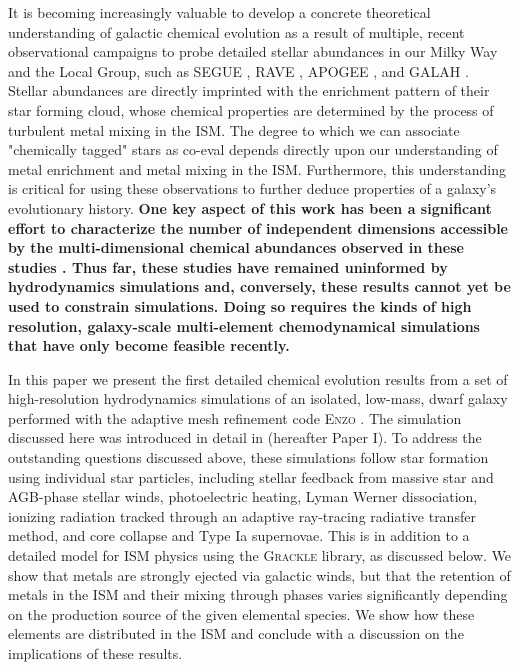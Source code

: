 \documentclass[twocolumn]{aastex61}
\begin{document}
It is becoming increasingly valuable to develop a concrete theoretical understanding of galactic chemical evolution as a result of multiple, recent observational campaigns to probe detailed stellar abundances in our Milky Way and the Local Group, such as SEGUE \citep{Yanny2009}, RAVE \citep{Kunder2017}, APOGEE \citep{Anders2014}, and GALAH \citep{Buder2018}. Stellar abundances are directly imprinted with the enrichment pattern of their star forming cloud, whose chemical properties are determined by the process of turbulent metal mixing in the ISM. The degree to which we can associate "chemically tagged" stars as co-eval depends directly upon our understanding of metal enrichment and metal mixing in the ISM. Furthermore, this understanding is critical for using these observations to further deduce properties of a galaxy's evolutionary history. \textbf{One key aspect of this work has been a significant effort to characterize the number of independent dimensions accessible by the multi-dimensional chemical abundances observed in these studies \citep[e.g][]{Ting2012, Hogg2016,Jofre2017,Price-Jones2018}. Thus far, these studies have remained uninformed by hydrodynamics simulations and, conversely, these results cannot yet be used to constrain simulations. Doing so requires the kinds of high resolution, galaxy-scale multi-element chemodynamical simulations that have only become feasible recently.}

In this paper we present the first detailed chemical evolution results from a set of high-resolution hydrodynamics simulations of an isolated, low-mass, dwarf galaxy performed with the adaptive mesh refinement code \textsc{Enzo} \citep{Enzo2014}. The simulation discussed here was introduced in detail in \cite{Emerick2018} (hereafter Paper I). To address the outstanding questions discussed above, these simulations follow star formation using individual star particles, including stellar feedback from massive star and AGB-phase stellar winds, photoelectric heating, Lyman Werner dissociation, ionizing radiation tracked through an adaptive ray-tracing radiative transfer method, and core collapse and Type Ia supernovae. This is in addition to a detailed model for ISM physics using the \textsc{Grackle} library, as discussed below. We show that metals are strongly ejected via galactic winds, but that the retention of metals in the ISM and their mixing through phases varies significantly depending on the production source of the given elemental species. We show how these elements are distributed in the ISM and conclude with a discussion on the implications of these results.
\end{document}
